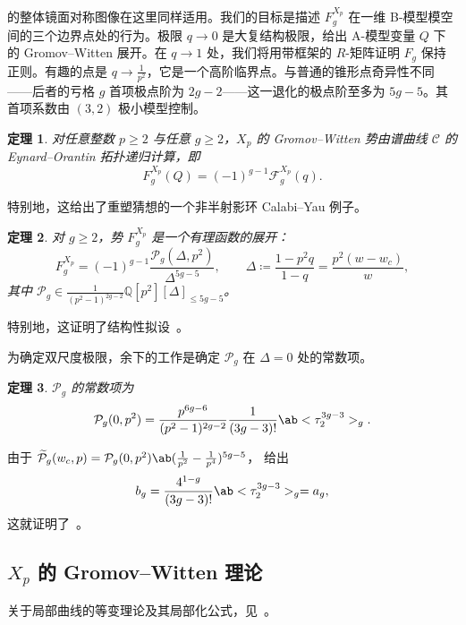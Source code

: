 \documentclass{amsart}
\newtheorem{thm}{定理}[section]
\theoremstyle{definition}
\theoremstyle{remark}
\theoremstyle{plain}
\theoremstyle{definition}
\theoremstyle{remark}
\newcommand{\Q}{\mathbb{Q}}
\newcommand{\mc}[1]{\mathcal{#1}}
\newcommand{\wt}[1]{\widetilde{#1}}
\newcommand{\1}{\mathbf{1}}
\newcommand{\2}{\mathbf{2}}
\newcommand{\3}{\mathbf{3}}
\begin{document}
 的整体镜面对称图像在这里同样适用。我们的目标是描述 \(F_g^{X_p}\) 在一维 B-模型模空间的三个边界点处的行为。极限 \(q \to 0\) 是大复结构极限，给出 A-模型变量 \(Q\) 下的 Gromov--Witten 展开。在 \(q \to 1\) 处，我们将用带框架的 \(R\)-矩阵证明 \(F_g\) 保持正则。有趣的点是 \(q \to \frac{1}{p^2}\)，它是一个高阶临界点。与普通的锥形点奇异性不同——后者的亏格 \(g\) 首项极点阶为 \(2g-2\)——这一退化的极点阶至多为 \(5g-5\)。其首项系数由 \((3,2)\) 极小模型控制。

\begin{thm}%
\label{thm:local P1 mirror symmetry}
    对任意整数 \(p \geq 2\) 与任意 \(g \geq 2\)，\(X_p\) 的 Gromov--Witten 势由谱曲线 \(\mc{C}\) 的 Eynard--Orantin 拓扑递归计算，即
    \[ F_g^{X_p}(Q) = (-1)^{g-1}\mc{F}_g^{X_p}(q). \]
\end{thm}

特别地，这给出了重塑猜想的一个非半射影环 Calabi--Yau 例子。

\begin{thm}%
\label{thm:local P1 rationality}
    对 \(g \geq 2\)，势 \(F_g^{X_p}\) 是一个有理函数的展开：
    \[ F_g^{X_p} = (-1)^{g-1}\frac{\mc{P}_g(\Delta,p^2)}{\Delta^{5g-5}}, \qquad \Delta \coloneqq \frac{1-p^2q}{1-q} = \frac{p^2(w-w_c)}{w}, \]
    其中 \(\mc{P}_g \in \frac{1}{(p^2-1)^{2g-2}}\Q[p^2][\Delta]_{\leq 5g-5}\)。
\end{thm}

特别地，这证明了结构性拟设~。

为确定双尺度极限，余下的工作是确定 \(\mc{P}_g\) 在 \(\Delta = 0\) 处的常数项。

\begin{thm}%
\label{thm:local P1 constant term}
    \(\mc{P}_g\) 的常数项为
    \[ \mc{P}_g(0,p^2) = \frac{p^{6g-6}}{(p^2-1)^{2g-2}}\frac{1}{(3g-3)!}\ab<\tau_2^{3g-3}>_g. \]
\end{thm}

由于 \(\wt{\mc{P}}_g(w_c,p) = \mc{P}_g(0,p^2)\ab(\frac{1}{p^2}-\frac{1}{p^4})^{5g-5}\)， 给出
\[ b_g = \frac{4^{1-g}}{(3g-3)!}\ab<\tau_2^{3g-3}>_g = a_g, \]
这就证明了~。

\subsection{\(X_p\) 的 Gromov--Witten 理论}%
\label{sub:Gromov-Witten theory of Xp}

关于局部曲线的等变理论及其局部化公式，见~\cite{BryanPandharipande2008}。
\end{document}

